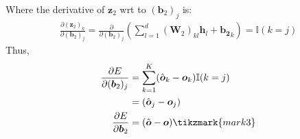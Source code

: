 \documentclass[11pt, a4paper, oneside]{memoir}
\begin{document}
Where the derivative of $\boldsymbol{z}_2$ wrt to $(\boldsymbol{b}_2)_j$ is:
\begin{align*}
    \frac{\partial (\boldsymbol{z}_2)_k}{\partial (\boldsymbol{b}_2)_j} = \frac{\partial}{\partial (\boldsymbol{b}_2)_j} \left( \sum_{l=1}^{d} (\mathbf{W}_2)_{kl} \boldsymbol{h}_l + \boldsymbol{b_2}_k \right) = \mathbb{I}(k=j)
\end{align*}
Thus,
\begin{align*}
    \frac{\partial E}{\partial (\boldsymbol{b}_2)_j} &= \sum_{k=1}^{K} (\hat{\boldsymbol{o}}_k - \boldsymbol{o}_k) \mathbb{I}(k=j) \\
    &= (\hat{\boldsymbol{o}}_j - \boldsymbol{o}_j) \\
    \frac{\partial E}{\partial \boldsymbol{b}_2} &= (\hat{\boldsymbol{o}} - \boldsymbol{o})
    \tikzmark{mark3}
\end{align*}
\end{document}
